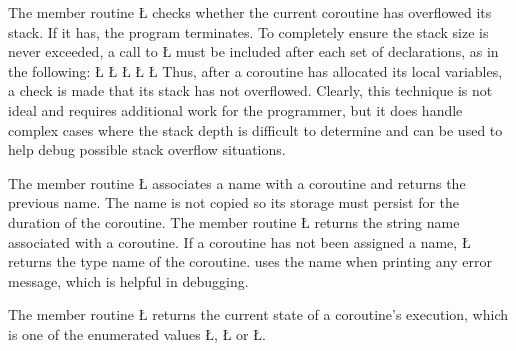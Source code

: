 \documentclass[openright,twoside]{report}
\begin{document}
The member routine \LGinlinetrue\LGbegin\lgrinde\L{}\endlgrinde\LGend{} checks whether the current coroutine has overflowed its stack.
If it has, the program terminates.
To completely ensure the stack size is never exceeded, a call to \LGinlinetrue\LGbegin\lgrinde\L{}\endlgrinde\LGend{} must be included after each set of declarations, as in the following:
\LGinlinefalse\LGbegin\lgrinde
\L{}
\L{\LB{}}
\CE{}\L{\LB{}}
\CE{}\L{\LB{}}
\CE{}\L{\LB{\}}}
\endlgrinde\LGend
Thus, after a coroutine has allocated its local variables, a check is made that its stack has not overflowed.
Clearly, this technique is not ideal and requires additional work for the programmer, but it does handle complex cases where the stack depth is difficult to determine and can be used to help debug possible stack overflow situations.

The member routine \LGinlinetrue\LGbegin\lgrinde\L{}\endlgrinde\LGend{} associates a name with a coroutine and returns the previous name.
The name is not copied so its storage must persist for the duration of the coroutine.
The member routine \LGinlinetrue\LGbegin\lgrinde\L{}\endlgrinde\LGend{} returns the string name associated with a coroutine.
If a coroutine has not been assigned a name, \LGinlinetrue\LGbegin\lgrinde\L{}\endlgrinde\LGend{} returns the type name of the coroutine.
\uC uses the name when printing any error message, which is helpful in debugging.

The member routine \LGinlinetrue\LGbegin\lgrinde\L{}\endlgrinde\LGend{} returns the current state of a coroutine's execution, which is one of the enumerated values \LGinlinetrue\LGbegin\lgrinde\L{}\endlgrinde\LGend{}, \LGinlinetrue\LGbegin\lgrinde\L{}\endlgrinde\LGend{} or \LGinlinetrue\LGbegin\lgrinde\L{}\endlgrinde\LGend{}.
\end{document}
